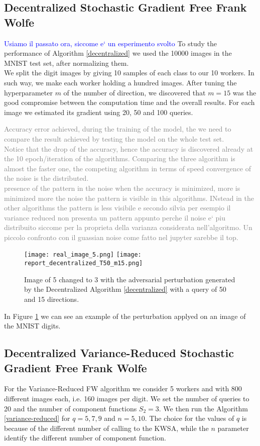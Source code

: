 \subsection{Decentralized Stochastic Gradient Free Frank Wolfe}
\textcolor{blue}{Usiamo il passato ora, siccome e` un esperimento svolto}
To study the performance of Algorithm \ref{decentralized} we used the 10000 images in the MNIST test set, after normalizing them.\\ We split the digit images by giving 10 samples of each class to our 10 workers. In such way, we make each worker holding a hundred images. After tuning the hyperparameter $m$ of the number of direction, we discovered that $m=15$ was the good compromise between the computation time and the overall results. For each image we estimated its gradient using 20, 50 and 100 queries.

\textcolor{gray}{Accuracy error achieved, during the training of the model, the we need to compare the result achieved by testing the model on the whole test set.\\ Notice that the drop of the accuracy, hence the accuracy is discovered already at the 10 epoch/iteration of the algorithms. Comparing the three algorithm is almost the faster one, the competing algorithm in terms of speed convergence of the noise is the distributed.
\\ presence of the pattern in the noise when the accuracy is minimized, more is minimized more the noise the pattern is visible in this algorithms. INstead in the other algorithms the pattern is less visibile e secondo silvia per esempio il variance reduced non presenta un pattern appunto perche il noise e` piu distribuito siccome per la proprieta della varianza considerata nell'algoritmo.
Un piccolo confronto con il guassian noise come fatto nel jupyter sarebbe il top.
}
\begin{figure}[htbp]
	\centering
	\texttt{[image: real\_image\_5.png]}\hfil
	\texttt{[image: report\_decentralized\_T50\_m15.png]}
	\caption{Image of 5 changed to 3 with the adversarial perturbation generated by the Decentralized Algorithm \ref{decentralized} with a query of 50 and 15 directions.}
	\label{fig:decentralized}
\end{figure}
In Figure \ref{fig:decentralized} we can see an example of the perturbation applyed on an image of the MNIST digits.

\subsection{Decentralized Variance-Reduced Stochastic Gradient Free Frank Wolfe}
For the Variance-Reduced FW algorithm we consider 5 workers and with 800 different images each, i.e. 160 images per digit. We set the number of queries to 20 and the number of component functions $S_2 = 3$. We then run the Algorithm \ref{variance-reduced} for $q=5,7,9$ and $n=5,10$. The choice for the values of $q$ is because of the different number of calling to the KWSA, while the $n$ parameter identify the different number of component function.\\

